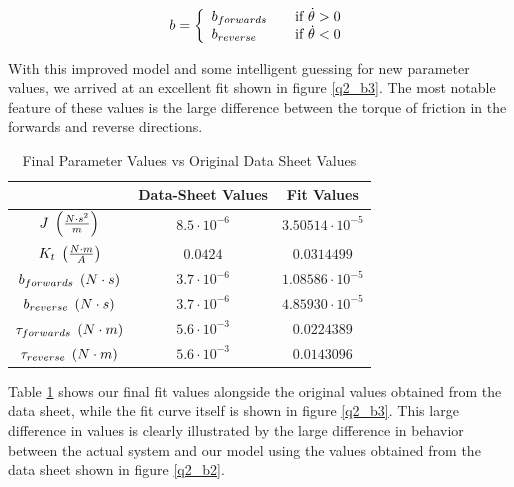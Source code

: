 \documentclass{article}
\theoremstyle{plain}
\theoremstyle{definition}
\theoremstyle{remark}
\begin{document}
\[
b = \left\{
\begin{array}{l l}
b_{forwards} & \quad \text{if } \dot{\theta} > 0 \\
b_{reverse} & \quad  \text{if } \dot{\theta} < 0 \\
\end{array} \right.
\]

With this improved model and some intelligent guessing for new parameter values, we arrived at an excellent fit shown in figure \ref{q2_b3}. The most notable feature of these values is the large difference between the torque of friction in the forwards and reverse directions. \\ 

\begin{table}[htb]
\begin{center}
    \begin{tabular}{|c|c|c|}
        \hline
        ~                 & Data-Sheet Values    & Fit Values              \\ \hline
        $J \hspace{0.1cm} \left( \frac{N \cdot s^2}{m} \right)$               & $8.5 \cdot 10^{-6} $     & $3.50514 \cdot 10^{-5}$ \\ 
        $K_{t} \hspace{0.1cm} \left( \frac{N\cdot m}{A} \right)$           & $0.0424$             & $0.0314499$             \\ 
        $b_{forwards} \hspace{0.1cm} \left( N \cdot s \right)$    & $3.7 \cdot 10^{-6} $ & $1.08586 \cdot 10^{-5}$ \\ 
        $b_{reverse} \hspace{0.1cm} \left( N \cdot s \right)$     & $3.7 \cdot 10^{-6} $ & $4.85930 \cdot 10^{-5}$ \\ 
        $\tau_{forwards} \hspace{0.1cm} \left( N \cdot m \right)$ & $5.6 \cdot 10^{-3}$  & $0.0224389$             \\ 
        $\tau_{reverse} \hspace{0.1cm} \left( N \cdot m \right)$   & $5.6 \cdot 10^{-3}$  & $0.0143096$             \\
        \hline
    \end{tabular}
\caption{Final Parameter Values vs Original Data Sheet Values}
\label{q2_b8}
\end{center}
\end{table}

Table \ref{q2_b8} shows our final fit values alongside the original values obtained from the data sheet, while the fit curve itself is shown in figure \ref{q2_b3}.  This large difference in values is clearly illustrated by the large difference in behavior between the actual system and our model using the values obtained from the data sheet shown in figure \ref{q2_b2}.  \\
\end{document}

